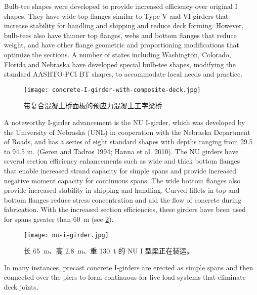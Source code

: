 Bulb-tee shapes were developed to provide increased efficiency over original I shapes. They have wide top flanges similar to Type V and VI girders that increase stability for handling and shipping and reduce deck forming. However, bulb-tees also have thinner top flanges, webs and bottom flanges that reduce weight, and have other flange geometric and proportioning modifications that optimize the sections. A number of states including Washington, Colorado, Florida and Nebraska have developed special bulb-tee shapes, modifying the standard AASHTO-PCI BT shapes, to accommodate local needs and practice.

\begin{figure}
  \texttt{[image: concrete-I-girder-with-composite-deck.jpg]}
  \caption{带复合混凝土桥面板的预应力混凝土工字梁桥}
  \label{fig:concrete-I-girder-with-composite-deck}
\end{figure}

A noteworthy I-girder advancement is the NU I-girder, which was developed by the University of Nebraska (UNL) in cooperation with the Nebraska Department of Roads, and has a series of eight standard shapes with depths ranging from 29.5 to 94.5 in. (Geren and Tadros 1994; Hanna et al. 2010). The NU girders have several section efficiency enhancements such as wide and thick bottom flanges that enable increased strand capacity for simple spans and provide increased negative moment capacity for continuous spans. The wide bottom flanges also provide increased stability in shipping and handling. Curved fillets in top and bottom flanges reduce stress concentration and aid the flow of concrete during fabrication. With the increased section efficiencies, these girders have been used for spans greater than \qty{60}{m} (see \cref{fig:nu-i-girder}).

\begin{figure}
  \texttt{[image: nu-i-girder.jpg]}
  \caption{长 \qty{65}{m}、高 \qty{2.8}{m}、重 \qty{130}{t} 的 NU I 型梁正在装运。}
  \label{fig:nu-i-girder}
\end{figure}

In many instances, precast concrete I-girders are erected as simple spans and then connected over the piers to form continuous for live load systems that eliminate deck joints.

